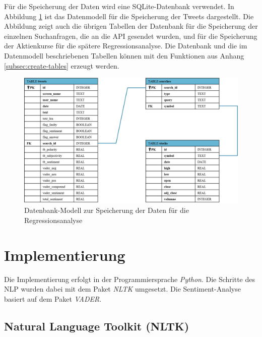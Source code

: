 \documentclass[
	a4paper,
	12pt,
	bibliography=totocnumbered,
	twoside,
]{scrreprt}
\begin{document}
Für die Speicherung der Daten wird eine SQLite-Datenbank verwendet. In Abbildung \ref{img:data-model} ist das Datenmodell für die Speicherung der Tweets dargestellt. Die Abbildung zeigt auch die übrigen Tabellen der Datenbank für die Speicherung der einzelnen Suchanfragen, die an die API gesendet wurden, und für die Speicherung der Aktienkurse für die spätere Regressionsanalyse. Die Datenbank und die im Datenmodell beschriebenen Tabellen können mit den Funktionen aus Anhang \ref{subsec:create-tables} erzeugt werden. \\

\begin{figure}[hbt!]
	\centering
	\includegraphics[width=.9\textwidth]{images/data-model.eps}
	\caption[Datenbank-Modell zur Speicherung der Daten]{Datenbank-Modell zur Speicherung der Daten für die Regressionsanalyse\footnotemark}
	\label{img:data-model}
\end{figure}


\section{Implementierung}
Die Implementierung erfolgt in der Programmiersprache \textit{Python}. Die Schritte des NLP wurden dabei mit dem Paket \textit{NLTK} umgesetzt. Die Sentiment-Analyse basiert auf dem Paket \textit{VADER}.


\subsection*{Natural Language Toolkit (NLTK)}
\end{document}
